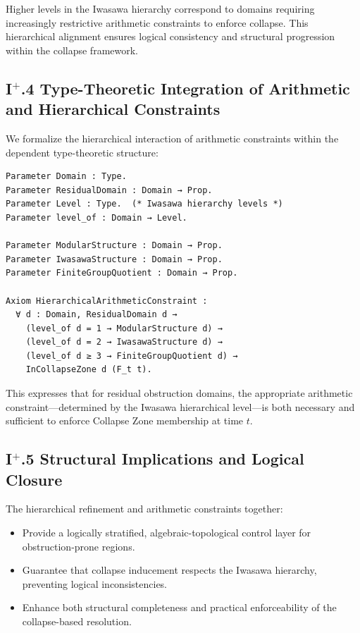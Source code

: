 \documentclass[11pt]{article}
\begin{document}
Higher levels in the Iwasawa hierarchy correspond to domains requiring increasingly restrictive arithmetic constraints to enforce collapse. This hierarchical alignment ensures logical consistency and structural progression within the collapse framework.

\subsection*{I$^{+}$.4 Type-Theoretic Integration of Arithmetic and Hierarchical Constraints}

We formalize the hierarchical interaction of arithmetic constraints within the dependent type-theoretic structure:

\begin{lstlisting}[language=Coq]
Parameter Domain : Type.
Parameter ResidualDomain : Domain → Prop.
Parameter Level : Type.  (* Iwasawa hierarchy levels *)
Parameter level_of : Domain → Level.

Parameter ModularStructure : Domain → Prop.
Parameter IwasawaStructure : Domain → Prop.
Parameter FiniteGroupQuotient : Domain → Prop.

Axiom HierarchicalArithmeticConstraint :
  ∀ d : Domain, ResidualDomain d →
    (level_of d = 1 → ModularStructure d) →
    (level_of d = 2 → IwasawaStructure d) →
    (level_of d ≥ 3 → FiniteGroupQuotient d) →
    InCollapseZone d (F_t t).
\end{lstlisting}

This expresses that for residual obstruction domains, the appropriate arithmetic constraint—determined by the Iwasawa hierarchical level—is both necessary and sufficient to enforce Collapse Zone membership at time \( t \).

\subsection*{I$^{+}$.5 Structural Implications and Logical Closure}

The hierarchical refinement and arithmetic constraints together:

\begin{itemize}
  \item Provide a logically stratified, algebraic-topological control layer for obstruction-prone regions.
  \item Guarantee that collapse inducement respects the Iwasawa hierarchy, preventing logical inconsistencies.
  \item Enhance both structural completeness and practical enforceability of the collapse-based resolution.
\end{itemize}
\end{document}
